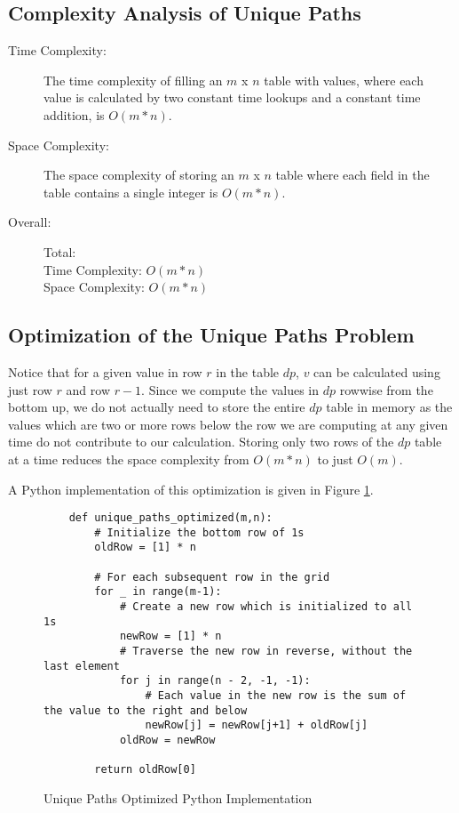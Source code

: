 \subsection{Complexity Analysis of Unique Paths}\label{ca-unique-paths}

\begin{description}
    \item[Time Complexity:]
        The time complexity of filling an $m$ x $n$ table with values,
        where each value is calculated by two constant time lookups and a constant time addition, is $O(m * n)$.
        
    \item[Space Complexity:] 
        The space complexity of storing an $m$ x $n$ table where each field in the table contains a single integer is $O(m * n)$.

    \item[Overall:] Total:\\
        Time Complexity: $O(m * n)$\\
        Space Complexity: $O(m * n)$
    
\end{description}

\subsection{Optimization of the Unique Paths Problem}
Notice that for a given value in row $r$ in the table $dp$, $v$ can be calculated using just row $r$ and row $r-1$.
Since we compute the values in $dp$ rowwise from the bottom up, we do not actually need to store the entire $dp$ table in memory as the values which are two or more rows below the row we are computing at any given time do not contribute to our calculation.
Storing only two rows of the $dp$ table at a time reduces the space complexity from $O(m * n)$ to just $O(m)$.

A Python implementation of this optimization is given in Figure \ref{fig:unique-paths-optimized}.

\begin{figure}[H]
    \centering
    \begin{lstlisting}
    def unique_paths_optimized(m,n):
        # Initialize the bottom row of 1s
        oldRow = [1] * n
    
        # For each subsequent row in the grid
        for _ in range(m-1):
            # Create a new row which is initialized to all 1s
            newRow = [1] * n
            # Traverse the new row in reverse, without the last element
            for j in range(n - 2, -1, -1):
                # Each value in the new row is the sum of the value to the right and below
                newRow[j] = newRow[j+1] + oldRow[j]
            oldRow = newRow
    
        return oldRow[0]
    \end{lstlisting}
    \caption{Unique Paths Optimized Python Implementation}
    \label{fig:unique-paths-optimized}
\end{figure}